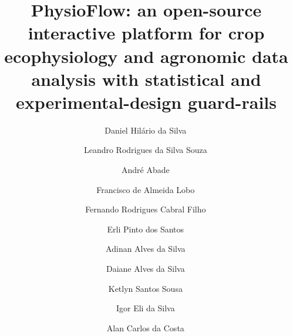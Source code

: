 \documentclass[preprint,12pt,a4paper]{elsarticle}
\begin{document}
\renewcommand{\labelenumii}{\arabic{enumi}.\arabic{enumii}}

\begin{frontmatter}

\title{PhysioFlow: an open-source interactive platform for crop ecophysiology and agronomic data analysis with statistical and experimental-design guard-rails}

\author[ifcat]{Daniel Hil\'ario da Silva\,}

\author[ceagre,ifgr]{Leandro Rodrigues da Silva Souza\,}

\author[ifmt]{Andr\'e Abade\,}

\author[ufmt]{Francisco de Almeida Lobo\,}

\author[ceagre,ifgr]{Fernando Rodrigues Cabral Filho\,}

\author[ufrrj]{Erli Pinto dos Santos\,}

\author[ifgr]{Adinan Alves da Silva\,}

\author[ceagre]{Daiane Alves da Silva\,}

\author[ifgr]{Ketlyn Santos Sousa\,}

\author[ifgr]{Igor Eli da Silva\,}

\author[ifgr]{Alan Carlos da Costa\,}

\address[ifcat]{Instituto Federal Goiano, Campus Catal\~ao, Goi\'as, Brazil}
\address[ceagre]{Center of Excellence in Exponential Agriculture (CEAGRE), Goi\'as, Brazil}
\address[ifgr]{Instituto Federal Goiano, Campus Rio Verde, Goi\'as, Brazil}
\address[ifmt]{Instituto Federal de Mato Grosso, Cuiab\'a, Mato Grosso, Brazil}
\address[ufmt]{Universidade Federal de Mato Grosso, Mato Grosso, Brazil}
\address[ufrrj]{Universidade Federal Rural do Rio de Janeiro, Serop\'edica, Rio de Janeiro, Brazil}



\end{frontmatter}
\end{document}
